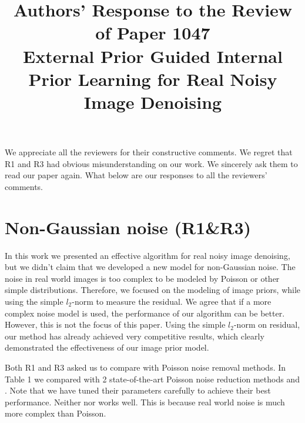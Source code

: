 \documentclass[10pt,twocolumn,letterpaper]{article}
\begin{document}
\title{Authors' Response to the Review of Paper 1047\\External Prior Guided Internal Prior Learning for Real Noisy Image Denoising}  %

\maketitle
\thispagestyle{empty}


We appreciate all the reviewers for their constructive comments. We regret that R1 and R3 had obvious misunderstanding on our work. We sincerely ask them to read our paper again. What below are our responses to all the reviewers' comments.


\vspace{-1mm}
\section{Non-Gaussian noise (R1\&R3)}
In this work we presented an effective algorithm for real noisy image denoising, but we didn't claim that we developed a new model for non-Gaussian noise. The noise in real world images is too complex to be modeled by Poisson or other simple distributions. Therefore, we focused on the modeling of image priors, while using the simple $l_{2}$-norm to measure the residual. We agree that if a more complex noise model is used, the performance of our algorithm can be better. However, this is not the focus of this paper. Using the simple $l_{2}$-norm on residual, our method has already achieved very competitive results, which clearly demonstrated the effectiveness of our image prior model.

Both R1 and R3 asked us to compare with Poisson noise removal methods. In Table 1 we compared with 2 state-of-the-art Poisson noise reduction methods \cite{Makitalo2013Optimal} and \cite{Salmon}. Note that we have tuned their parameters carefully to achieve their best performance. Neither \cite{Makitalo2013Optimal} nor \cite{Salmon} works well. This is because real world noise is much more complex than Poisson.
\end{document}
